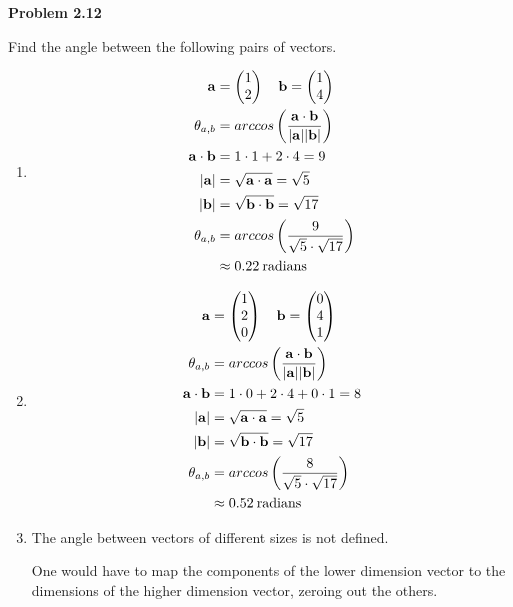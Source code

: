 \documentclass[12pt]{article}
\newenvironment{problem}[1][default]{
  \begin{framed}\begin{minipage}{0.97\textwidth}
  \setlength{\parskip}{4mm}
  {\bf Problem #1}
}{\end{minipage}\end{framed}}
\newenvironment{abc}{\begin{enumerate}[label={\bf(\alph*)}]}{\end{enumerate}}
\newcommand\m[2][]{
	\ifthenelse{\equal {#1} {}}
		{\begin{pmatrix*}[r]#2\end{pmatrix*}}
		{\left(\begin{array}{#1}#2\end{array}\right)}
}
\newcommand\magnitude[1]{
	\lvert{#1}\rvert
}
\renewcommand{\vec}[1]{\mathbf{#1}}
\begin{document}
\begin{problem}[2.12]
	Find the angle between the following pairs of vectors.
\end{problem}

\begin{abc}
\item{
	\begin{equation*}
	\begin{aligned}
		\vec{a} &= \m{1 \\ 2} \quad \vec{b} = \m{1 \\ 4} \\
		\theta_{a,b} &= arccos \left( \frac{\vec{a}\cdot\vec{b}}{\magnitude{\vec{a}} \magnitude{\vec{b}}} \right) \\
		\vec{a} \cdot \vec{b} &= 1 \cdot 1 + 2 \cdot 4 = 9 \\
		\magnitude{\vec{a}} &= \sqrt{\vec{a} \cdot \vec{a}} = \sqrt{5} \\
		\magnitude{\vec{b}} &= \sqrt{\vec{b} \cdot \vec{b}} = \sqrt{17} \\
		\theta_{a,b} &= arccos \left( \frac{9}{\sqrt{5} \cdot \sqrt{17}} \right) \\
			     &\approx 0.22 \: \text{radians}
	\end{aligned}
	\end{equation*}
}

\item{
	\begin{equation*}
	\begin{aligned}
		\vec{a} &= \m{1 \\ 2 \\ 0} \quad \vec{b} = \m{0 \\ 4 \\ 1} \\
		\theta_{a,b} &= arccos \left( \frac{\vec{a}\cdot\vec{b}}{\magnitude{\vec{a}} \magnitude{\vec{b}}} \right) \\
		\vec{a} \cdot \vec{b} &= 1 \cdot 0 + 2 \cdot 4 + 0 \cdot 1 = 8 \\
		\magnitude{\vec{a}} &= \sqrt{\vec{a} \cdot \vec{a}} = \sqrt{5} \\
		\magnitude{\vec{b}} &= \sqrt{\vec{b} \cdot \vec{b}} = \sqrt{17} \\
		\theta_{a,b} &= arccos \left( \frac{8}{\sqrt{5} \cdot \sqrt{17}} \right) \\
			     &\approx 0.52 \: \text{radians}
	\end{aligned}
	\end{equation*}
}

\item{
	The angle between vectors of different sizes is not defined.

	One would have to map the components of the lower dimension vector to the dimensions of the higher dimension vector, zeroing out the others.
}
\end{abc}
\end{document}
